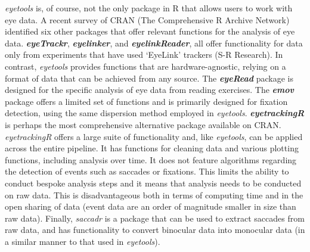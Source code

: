 \documentclass[
  man,
  floatsintext,
  longtable,
  nolmodern,
  notxfonts,
  notimes,
  colorlinks=true,linkcolor=blue,citecolor=blue,urlcolor=blue]{apa7}
\begin{document}
\emph{eyetools} is, of course, not the only package in R that allows
users to work with eye data. A recent survey of CRAN (The Comprehensive
R Archive Network) identified six other packages that offer relevant
functions for the analysis of eye data. \textbf{\emph{eyeTrackr}},
\textbf{\emph{eyelinker}}, and \textbf{\emph{eyelinkReader}}, all offer
functionality for data only from experiments that have used `EyeLink'
trackers (S-R Research). In contrast, \emph{eyetools} provides functions
that are hardware-agnostic, relying on a format of data that can be
achieved from any source. The \textbf{\emph{eyeRead}} package is
designed for the specific analysis of eye data from reading exercises.
The \textbf{\emph{emov}} package offers a limited set of functions and
is primarily designed for fixation detection, using the same dispersion
method employed in \emph{eyetools}. \textbf{\emph{eyetrackingR}} is
perhaps the most comprehensive alternative package available on CRAN.
\emph{eyetrackingR} offers a large suite of functionality and, like
\emph{eyetools}, can be applied across the entire pipeline. It has
functions for cleaning data and various plotting functions, including
analysis over time. It does not feature algorithms regarding the
detection of events such as saccades or fixations. This limits the
ability to conduct bespoke analysis steps and it means that analysis
needs to be conducted on raw data. This is disadvantageous both in terms
of computing time and in the open sharing of data (event data are an
order of magnitude smaller in size than raw data). Finally,
\emph{saccadr} is a package that can be used to extract saccades from
raw data, and has functionality to convert binocular data into monocular
data (in a similar manner to that used in \emph{eyetools}).
\end{document}
